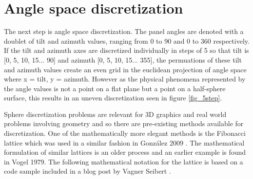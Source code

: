 






\newpage
\section{Angle space discretization}\label{angle_space_discretization}
The next step is angle space discretization. The panel angles are denoted with a doublet of tilt and azimuth values, ranging from 0 to 90 and 0 to 360 respectively. If the tilt and azimuth axes are discretized individually in steps of 5 so that tilt is [0, 5, 10, 15... 90] and azimuth [0, 5, 10, 15... 355], the permuations of these tilt and azimuth values create an even grid in the euclidean projection of angle space where x = tilt, y = azimuth. However as the physical phenomena represented by the angle values is not a point on a flat plane but a point on a half-sphere surface, this results in an uneven discretization seen in figure \ref{fig_5step}. 

Sphere discretization problems are relevant for 3D graphics and real world problems involving geometry and so there are pre-existing methods available for discretization. One of the mathematically more elegant methods is the Fibonacci lattice which was used in a similar fashion in González 2009 \cite{Gonzlez}. The mathematical formulation of similar lattices is an older process and an earlier example is found in Vogel 1979\cite{fibolat_old}. The following mathematical notation for the lattice is based on a code sample included in a blog post by Vagner Seibert \cite{medium_fibolat_equation}.




